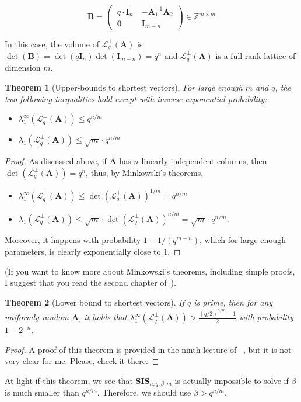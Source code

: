 \documentclass[a4paper,11pt]{article}
\let\vec\mathbf %
\newcommand\Z{{\mathbb Z}}
\newcommand\A{{\mathbf A}}
\newcommand\LqA{\mathcal{L}_q^{\bot}\left(\A\right)}
\newcommand\SIS{\textbf{SIS}_{n, q, \beta, m}}
\newtheorem{theorem}{Theorem}[section]
\theoremstyle{definition}
\theoremstyle{remark}
\begin{document}
$$
\vec{B} =
    \begin{pmatrix}
    ~q\cdot\vec{I}_n~  & -\A_1^{-1}\A_2 \\
    ~\vec 0~  & \vec{I}_{m-n}
    \end{pmatrix} \in \Z^{m \times m}
$$

In this case, the volume of $\LqA$ is $\det(\vec B) = \det(q\vec{I}_n)
\det({\vec I}_{m-n}) = q^n$ and $\LqA$ is a full-rank lattice of dimension $m$.

\begin{theorem}[Upper-bounds to shortest vectors]
For large enough $m$ and $q$, the two following inequalities hold except with
inverse exponential probability:
\begin{itemize}
\item $\lambda_1^{\infty}(\LqA) \le q^{n/m}$
\item $\lambda_1(\LqA) \le \sqrt{m}\cdot q^{n/m}$
\end{itemize}
\end{theorem}
\begin{proof}
As discussed above, if $\A$ has $n$ linearly independent columns, then
$\det(\LqA) = q^n$, thus, by Minkowski's theorems,
\begin{itemize}
\item $\lambda_1^{\infty}(\LqA) \le \det(\LqA)^{1/m} = q^{n/m}$
\item $\lambda_1(\LqA) \le \sqrt{m}\cdot \det(\LqA)^{n/m} = \sqrt{m}\cdot
q^{n/m}$.
\end{itemize}

Moreover, it happens with probability $1- 1/(q^{m-n})$, which for large enough
parameters, is clearly exponentially close to $1$.
\end{proof}

(If you want to know more about Minkowski's theorems, including simple proofs,
I suggest that you read the second chapter of~\cite{mic14}).

\begin{theorem}[Lower bound to shortest vectors]
If $q$ is prime, then for any uniformly random $\A$, it holds that
$\lambda_1^{\infty}(\LqA) > \frac{(q/2)^{n/m} -1}{2}$ with probability $1 -
2^{-n}$.
\end{theorem}
\begin{proof}
A proof of this theorem is provided in the ninth lecture of ~\cite{dd18}, but
it is not very clear for me. Please, check it there.
\end{proof}

At light if this theorem, we see that  $\SIS$ is actually impossible to solve if
$\beta$ is much smaller than $q^{n/m}$. Therefore, we should use $\beta >
q^{n/m}$.
\end{document}
